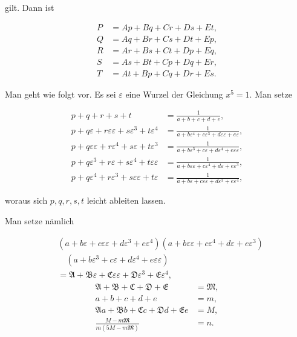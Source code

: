 
\noindent gilt. Dann ist

\[
\begin{aligned}
P &= Ap + Bq + Cr + Ds + Et,\\[3pt]
Q &= Aq + Br + Cs + Dt + Ep,\\[3pt]
R &= Ar + Bs + Ct + Dp + Eq,\\[3pt]
S &= As + Bt + Cp + Dq + Er,\\[3pt]
T &= At + Bp + Cq + Dr + Es.
\end{aligned}
\]

Man geht wie folgt vor. Es sei $\varepsilon$ eine Wurzel der
Gleichung $x^5=1$. Man setze

\[
\begin{aligned}
p+q+r+s+t &= \frac{1}{a+b+c+d+e},\\[3pt]
p+q\varepsilon+r\varepsilon\varepsilon+s\varepsilon^3+t\varepsilon^4
  &= \frac{1}{a+b\varepsilon^4+c\varepsilon^3+d\varepsilon\varepsilon+e\varepsilon},\\[3pt]
p+q\varepsilon\varepsilon+r\varepsilon^4+s\varepsilon+t\varepsilon^3
  &= \frac{1}{a+b\varepsilon^3+c\varepsilon+d\varepsilon^4+e\varepsilon\varepsilon},\\[3pt]
p+q\varepsilon^3+r\varepsilon+s\varepsilon^4+t\varepsilon\varepsilon
  &= \frac{1}{a+b\varepsilon\varepsilon+c\varepsilon^4+d\varepsilon+e\varepsilon^3},\\[3pt]
p+q\varepsilon^4+r\varepsilon^3+s\varepsilon\varepsilon+t\varepsilon
  &= \frac{1}{a+b\varepsilon+c\varepsilon\varepsilon+d\varepsilon^3+e\varepsilon^4},
\end{aligned}
\]

\noindent woraus sich $p, q, r, s, t$ leicht ableiten lassen.

Man setze nämlich

\[
\begin{aligned}
&(a+b\varepsilon+c\varepsilon\varepsilon+d\varepsilon^3+e\varepsilon^4)
(a+b\varepsilon\varepsilon+c\varepsilon^4+d\varepsilon+e\varepsilon^3)\\
&\quad(a+b\varepsilon^3+c\varepsilon+d\varepsilon^4+e\varepsilon\varepsilon)
\\
&= \mathfrak{A}+\mathfrak{B}\varepsilon+\mathfrak{C}\varepsilon\varepsilon
  +\mathfrak{D}\varepsilon^3+\mathfrak{E}\varepsilon^4,
\end{aligned}
\]
\[
\begin{aligned}
\mathfrak{A}+\mathfrak{B}+\mathfrak{C}+\mathfrak{D}+\mathfrak{E} &= \mathfrak{M},\\[3pt]
a+b+c+d+e &= m,\\[3pt]
\mathfrak{A}a+\mathfrak{B}b+\mathfrak{C}c+\mathfrak{D}d+\mathfrak{E}e &= M,\\[3pt]
\frac{M-m\mathfrak{M}}{m(5M-m\mathfrak{M})} &= n.
\end{aligned}
\]

